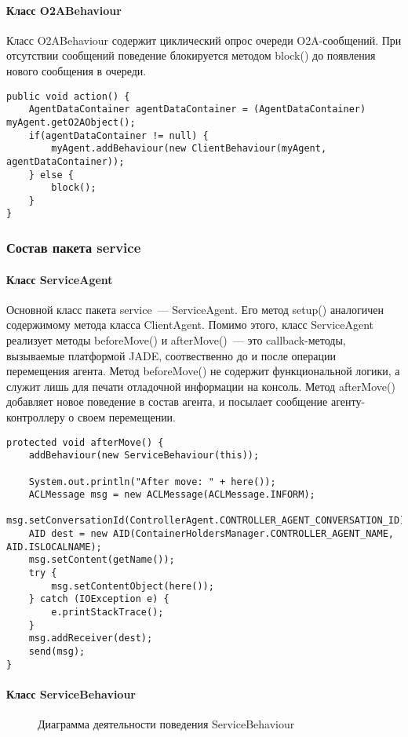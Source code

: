 \paragraph{Класс O2ABehaviour}
Класс O2ABehaviour содержит циклический опрос очереди O2A-сообщений. При отсутствии сообщений поведение блокируется методом block() до появления нового сообщения в очереди.
\begin{verbatim}
public void action() {
    AgentDataContainer agentDataContainer = (AgentDataContainer) myAgent.getO2AObject();
    if(agentDataContainer != null) {
        myAgent.addBehaviour(new ClientBehaviour(myAgent, agentDataContainer));
    } else {
        block();
    }
}
\end{verbatim}

\subsubsection{Состав пакета service}
\paragraph{Класс ServiceAgent}
Основной класс пакета service~--- ServiceAgent. Его метод setup() аналогичен содержимому метода класса ClientAgent. Помимо этого, класс ServiceAgent реализует методы beforeMove() и afterMove()~--- это callback-методы, вызываемые платформой JADE, соотвественно до и после операции перемещения агента. Метод beforeMove() не содержит функциональной логики, а служит лишь для печати отладочной информации на консоль. Метод afterMove() добавляет новое поведение в состав агента, и посылает сообщение агенту-контроллеру о своем перемещении.
\begin{verbatim}
protected void afterMove() {
    addBehaviour(new ServiceBehaviour(this));

    System.out.println("After move: " + here());
    ACLMessage msg = new ACLMessage(ACLMessage.INFORM);
    msg.setConversationId(ControllerAgent.CONTROLLER_AGENT_CONVERSATION_ID);
    AID dest = new AID(ContainerHoldersManager.CONTROLLER_AGENT_NAME, AID.ISLOCALNAME);
    msg.setContent(getName());
    try {
        msg.setContentObject(here());
    } catch (IOException e) {
        e.printStackTrace();
    }
    msg.addReceiver(dest);
    send(msg);
}
\end{verbatim}

\paragraph{Класс ServiceBehaviour}
\begin{figure}[h!]
\caption{Диаграмма деятельности поведения ServiceBehaviour}
\label{3:service-beh}
\end{figure}


